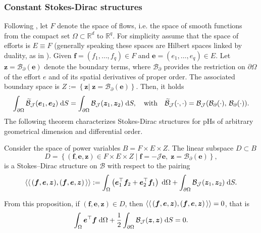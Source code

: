 \subsubsection{Constant Stokes-Dirac structures}
Following \cite{macchelli2005modelling}, let ${F}$ denote the space of flows, i.e. the space of smooth functions from the compact set $\Omega \subset \mathbb{R}^d$ to $\mathbb{R}^q$. For simplicity assume that  the space of efforts is ${E} \equiv {F}$ (generally speaking these spaces are Hilbert spaces linked by duality, as in \cite{villegas2007}). Given $\bm{f} = (f_1, \dots, f_q) \in {F}$ and $\bm{e} = (e_1, \dots, e_q) \in {E}$. Let $\bm{z} = \mathcal{B}_\partial(\bm{e})$ denote the boundary terms, where $\mathcal{B}_\partial$ provides the restriction on $\partial\Omega$ of the effort $e$ and of its spatial derivatives of proper order. The associated boundary space is ${Z} := \left\{ \bm{z} \vert \; \bm{z} = \mathcal{B}_{\partial}(\bm{e})  \right\}$. Then, it holds
\begin{equation}
\int_{\partial \Omega} \widetilde{\mathcal{B}}_{\mathcal{J}}(\bm{e}_1, \bm{e}_2) \d{S} = \int_{\partial \Omega} \mathcal{B}_{\mathcal{J}}(\bm{z}_1, \bm{z}_2) \d{S}, \quad \text{with} \quad  \widetilde{\mathcal{B}}_\mathcal{J}(\cdot, \cdot) = \mathcal{B}_{\mathcal{J}}(\mathcal{B}_{\partial}(\cdot), \, \mathcal{B}_{\partial}(\cdot)).
\end{equation}
The following theorem characterizes Stokes-Dirac structures for pHs of arbitrary geometrical dimension and differential order.
\begin{proposition}
	\label{prop:StokesDirac}
	
	Consider the space of power variables ${B} = {F} \times {E} \times {Z}$. The linear subspace ${D} \subset {B}$
	\begin{equation}
	{D} = \left\{ (\bm{f}, \bm{e}, \bm{z}) \in  {F} \times {E} \times {Z} \; \vert \; \bm{f} = -\mathcal{J} \bm{e}, \; \bm{z} = \mathcal{B}_\partial(\bm{e}) \right\},
	\end{equation}
	is a Stokes–Dirac structure on $\mathcal{B}$ with respect to the pairing
	\begin{equation}
	\bilprod{(\bm{f}, \bm{e}, \bm{z})}{(\bm{f}, \bm{e}, \bm{z})}  := \int_{\Omega} \left( \bm{e}_1^\top \bm{f}_2 + \bm{e}_2^\top \bm{f}_1 \right) \d\Omega + \int_{\partial \Omega} \mathcal{B}_{\mathcal{J}}(\bm{z}_1, \bm{z}_2) \d{S}.
	\end{equation}
\end{proposition}
From this proposition, if $(\bm{f}, \bm{e}, \bm{z}) \in  D$, then $\langle \langle \, (\bm{f}, \bm{e}, \bm{z}), (\bm{f}, \bm{e}, \bm{z}) \, \rangle \rangle=0$, that is
\begin{equation}\label{eq:enbalstr}
\int_{\Omega} \bm{e}^\top \bm{f}  \d\Omega + \frac{1}{2} \int_{\partial \Omega} \mathcal{B}_{\mathcal{J}}(\bm{z}, \bm{z}) \d{S} = 0.
\end{equation}


